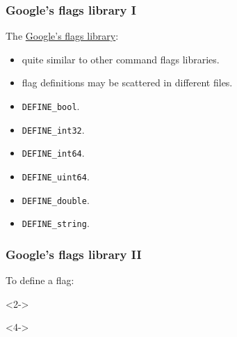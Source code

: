 \documentclass[utf8x,xcolor=dvipsnames]{beamer}
\newcommand{\code}[1]{\texttt{#1}}
\begin{document}
\begin{frame}[fragile]
\frametitle{Google's flags library I}

The \href{http://code.google.com/p/gflags/}{Google's flags library}:


 \begin{itemize}
      \item<2->  quite similar to other command flags libraries.
      \item<3->  flag definitions may be scattered in different files.
 \end{itemize}




\begin{itemize}
\item<5-> \code{DEFINE\_bool}.
\item<6-> \code{DEFINE\_int32}.
\item<7-> \code{DEFINE\_int64}.
\item<8-> \code{DEFINE\_uint64}.
\item<9-> \code{DEFINE\_double}.
\item<10-> \code{DEFINE\_string}.
\end{itemize}

\end{frame}

\begin{frame}[fragile]
\frametitle{Google's flags library II}

To define a flag:
\medskip

\begin{uncoverenv}<2->
\begin{mycode}
  
  
\end{mycode}
\end{uncoverenv}

\medskip
{}
\medskip

\begin{uncoverenv}<4->
\begin{mycode}
     
    
   
\end{mycode}
\end{uncoverenv}


\end{frame}
\end{document}
